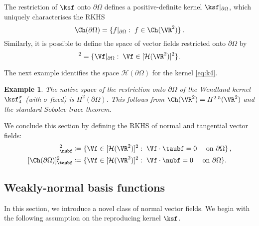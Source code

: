 \documentclass{siamart1116}
\newtheorem{example}[theorem]{Example}
\numberwithin{theorem}{section}
\begin{document}
The restriction of $\ksf$ onto $\partial \Omega$ defines a positive-definite kernel
$\ksf\vert_{\partial\Omega}$, which
uniquely characterises the RKHS \cite[p.169]{Wendlandbook}
\begin{equation}
\Ch(\partial \Omega) = \{f|_{\partial \Omega}:\; f\in \Ch(\VR^2)\}\,.
\end{equation}
Similarly, it is possible to define the space of vector fields restricted onto $\partial\Omega$ by
\begin{equation}
[\mathcal H(\partial \Omega)]^2 = \{\Vf|_{\partial \Omega}:\; \Vf\in [\mathcal H(\VR^2)]^2\}.
\end{equation}

The next example identifies the space $\mathcal H(\partial \Omega)$ for the kernel \cref{eq:k4}.
\begin{example}
The native space of the restriction onto $\partial\Omega$ of the Wendland kernel $\ksf_4^\sigma$
(with $\sigma$ fixed)
is $H^2(\partial \Omega)$. This follows from $\Ch(\VR^2) = H^{2.5}(\VR^2)$ and 
the standard Sobolev trace theorem.
\end{example}
We conclude this section by defining the RKHS of normal and tangential vector fields:
\begin{align}
[\Ch(\partial \Omega)]^2_{\nubf} &\coloneqq \{\Vf\in[\mathcal H(\VR^2)]^2:\;\Vf\cdot \taubf =0 \quad \text{ on } \partial \Omega  \}\,,\\
[\Ch(\partial \Omega)]^2_{\taubf} &\coloneqq \{\Vf\in[\mathcal H(\VR^2)]^2:\; \Vf\cdot \nubf =0 \quad \text{ on } \partial \Omega  \}.
\end{align}

\subsection{Weakly-normal basis functions}
In this section, we introduce a novel class of normal vector fields.
We begin with the following assumption on the reproducing kernel $\ksf$.
\end{document}
